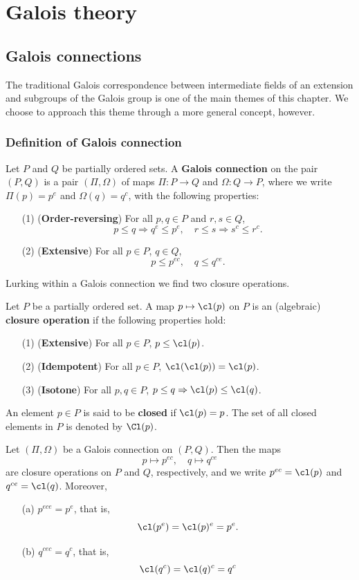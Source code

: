 \section{Galois theory}
\subsection{Galois connections}
The traditional Galois correspondence between intermediate fields of an
extension and subgroups of the Galois group is one of the main themes of this chapter. We choose to approach this theme through a more general concept, however.
\subsubsection{Definition of Galois connection}
\begin{definition}
Let $P$ and $Q$ be partially ordered sets. A \textbf{Galois connection} on the pair $(P,Q)$ is a pair $(\Pi,\Omega)$ of maps $\Pi:P\to Q$ and $\Omega:Q\to P$, where we write $\Pi(p)=p^e$ and $\Omega(q)=q^c$, with the following properties:
\begin{itemize}
\item[(1)] (\textbf{Order-reversing}) For all $p,q\in P$ and $r,s\in Q$,
\[p\leq q\Rightarrow q^e\leq p^e,\quad r\leq s\Rightarrow s^c\leq r^c.\] 
\item[(2)] (\textbf{Extensive}) For all $p\in P$, $q\in Q$,
\[p\leq p^{ec},\quad q\leq q^{ce}.\] 
\end{itemize}
\end{definition}
Lurking within a Galois connection we find two closure operations.
\begin{definition}
Let $P$ be a partially ordered set. A map $p\mapsto\cl(p)$ on $P$ is an (algebraic) \textbf{closure operation} if the following properties hold:
\begin{itemize}
\item[(1)] (\textbf{Extensive}) For all $p\in P$, $p\leq\cl(p)$.
\item[(2)] (\textbf{Idempotent}) For all $p\in P$, $\cl(\cl(p))=\cl(p)$.
\item[(3)] (\textbf{Isotone}) For all $p,q\in P$, $p\leq q\Rightarrow\cl(p)\leq\cl(q)$.
\end{itemize}
An element $p\in P$ is said to be \textbf{closed} if $\cl(p)=p$. The set of all closed elements in $P$ is denoted by $\Cl(p)$.
\end{definition}
\begin{theorem}
Let $(\Pi,\Omega)$ be a Galois connection on $(P,Q)$. Then the maps
\[p\mapsto p^{ec},\quad q\mapsto q^{ce}\]
are closure operations on $P$ and $Q$, respectively, and we write $p^{ec}=\cl(p)$ and $q^{ce}=\cl(q)$. Moreover,
\begin{itemize}
\item[(a)] $p^{ece}=p^e$, that is,
\[\cl(p^e)=\cl(p)^e=p^e.\]
\item[(b)] $q^{cec}=q^{c}$, that is,
\[\cl(q^c)=\cl(q)^c=q^c\]  
\end{itemize}
\end{theorem}
